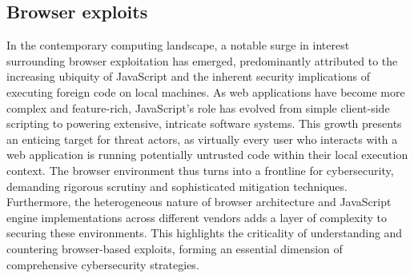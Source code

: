 \documentclass{article}
\begin{document}
\begin{minipage}{\textwidth}
  \centering
\end{minipage}

\subsection{Browser exploits}
In the contemporary computing landscape, a notable surge in interest surrounding
browser exploitation has emerged, predominantly attributed to the increasing
ubiquity of JavaScript and the inherent security implications of executing
foreign code on local machines. As web applications have become more complex and
feature-rich, JavaScript's role has evolved from simple client-side scripting to
powering extensive, intricate software systems. This growth presents an enticing
target for threat actors, as virtually every user who interacts with a web
application is running potentially untrusted code within their local execution
context. The browser environment thus turns into a frontline for cybersecurity,
demanding rigorous scrutiny and sophisticated mitigation techniques.
Furthermore, the heterogeneous nature of browser architecture and JavaScript
engine implementations across different vendors adds a layer of complexity to
securing these environments. This highlights the criticality of understanding
and countering browser-based exploits, forming an essential dimension of
comprehensive cybersecurity strategies.
\end{document}
